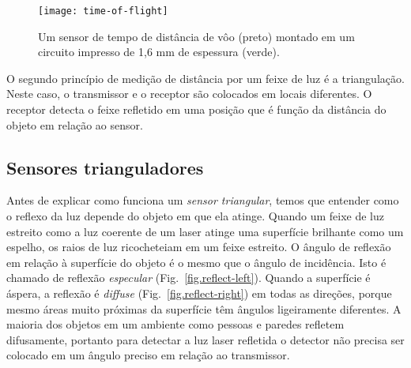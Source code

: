 \begin{figure}
\texttt{[image: time-of-flight]}
\caption{Um sensor de tempo de distância de vôo (preto) montado em um circuito impresso de 1,6 mm de espessura (verde).}\label{fig.ir}
\end{figure}

O segundo princípio de medição de distância por um feixe de luz é a triangulação. Neste caso, o transmissor e o receptor são colocados em locais diferentes. O receptor detecta o feixe refletido em uma posição que é função da distância do objeto em relação ao sensor.

\subsection{Sensores trianguladores}\label{s.triangulating-sensors}

Antes de explicar como funciona um \emph{sensor triangular}, temos que entender como o reflexo da luz depende do objeto em que ela atinge. Quando um feixe de luz estreito como a luz coerente de um laser atinge uma superfície brilhante como um espelho, os raios de luz ricocheteiam em um feixe estreito. O ângulo de reflexão em relação à superfície do objeto é o mesmo que o ângulo de incidência. Isto é chamado de reflexão \emph{especular} (Fig.~\ref{fig.reflect-left}). Quando a superfície é áspera, a reflexão é \emph{diffuse} (Fig.~\ref{fig.reflect-right}) em todas as direções, porque mesmo áreas muito próximas da superfície têm ângulos ligeiramente diferentes. A maioria dos objetos em um ambiente como pessoas e paredes refletem difusamente, portanto para detectar a luz laser refletida o detector não precisa ser colocado em um ângulo preciso em relação ao transmissor.

